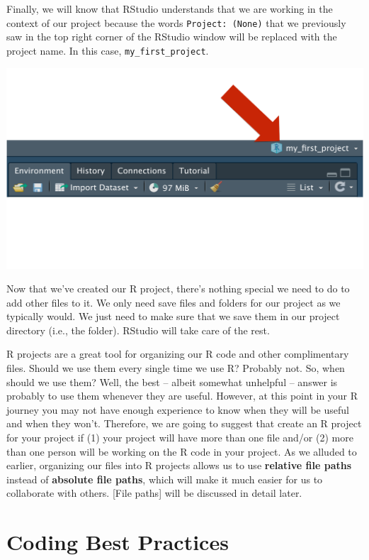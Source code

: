 \documentclass[
  letterpaper,
  DIV=11,
  numbers=noendperiod]{scrreprt}
\begin{document}
Finally, we will know that RStudio understands that we are working in
the context of our project because the words \texttt{Project:\ (None)}
that we previously saw in the top right corner of the RStudio window
will be replaced with the project name. In this case,
\texttt{my\_first\_project}.

\includegraphics{chapters/r_projects/check_rproj.png}

Now that we've created our R project, there's nothing special we need to
do to add other files to it. We only need save files and folders for our
project as we typically would. We just need to make sure that we save
them in our project directory (i.e., the folder). RStudio will take care
of the rest.

R projects are a great tool for organizing our R code and other
complimentary files. Should we use them every single time we use R?
Probably not. So, when should we use them? Well, the best -- albeit
somewhat unhelpful -- answer is probably to use them whenever they are
useful. However, at this point in your R journey you may not have enough
experience to know when they will be useful and when they won't.
Therefore, we are going to suggest that create an R project for your
project if (1) your project will have more than one file and/or (2) more
than one person will be working on the R code in your project. As we
alluded to earlier, organizing our files into R projects allows us to
use \textbf{relative file paths} instead of \textbf{absolute file
paths}, which will make it much easier for us to collaborate with
others. {[}File paths{]} will be discussed in detail later.

\chapter{Coding Best Practices}\label{coding-best-practices}
\end{document}
